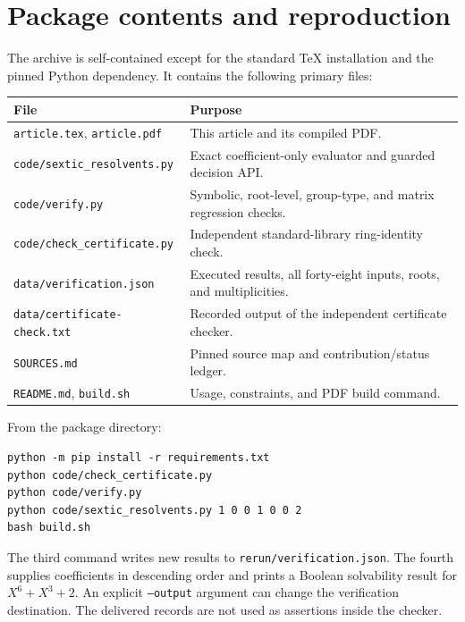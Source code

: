 \documentclass[11pt,letterpaper]{article}
\numberwithin{equation}{section}
\theoremstyle{definition}
\theoremstyle{remark}
\newcommand{\code}[1]{\texttt{\small #1}}
\begin{document}
\appendix
\setcounter{section}{5}%
\section{Package contents and reproduction}
\label{zpt:app:package}
The archive is self-contained except for the standard TeX installation and
the pinned Python dependency. It contains the following primary files:
\begin{center}\small
\begin{tabular}{@{}p{}p{}@{}}
\toprule
File & Purpose\\
\midrule
\code{article.tex}, \code{article.pdf}&This article and its compiled PDF.\\
\code{code/sextic\_resolvents.py}&Exact coefficient-only evaluator and guarded decision API.\\
\code{code/verify.py}&Symbolic, root-level, group-type, and matrix regression checks.\\
\code{code/check\_certificate.py}&Independent standard-library ring-identity check.\\
\code{data/verification.json}&Executed results, all forty-eight inputs, roots, and multiplicities.\\
\code{data/certificate-check.txt}&Recorded output of the independent certificate checker.\\
\code{SOURCES.md}&Pinned source map and contribution/status ledger.\\
\code{README.md}, \code{build.sh}&Usage, constraints, and PDF build command.\\
\bottomrule
\end{tabular}
\end{center}
From the package directory:
\begin{verbatim}
python -m pip install -r requirements.txt
python code/check_certificate.py
python code/verify.py
python code/sextic_resolvents.py 1 0 0 1 0 0 2
bash build.sh
\end{verbatim}
The third command writes new results to \code{rerun/verification.json}.
The fourth supplies coefficients in descending order and prints a Boolean
solvability result for $X^6+X^3+2$. An explicit \code{--output} argument
can change the verification destination. The delivered records are not
used as assertions inside the checker.
\end{document}
